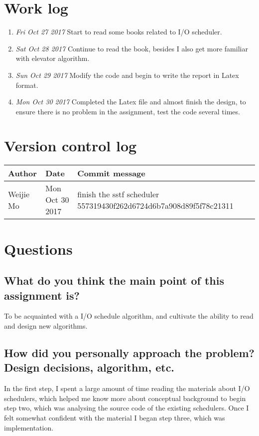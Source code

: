 \documentclass[10pt,draftclsnofoot,peerreview,letterpaper,onecolumn,]{IEEEtran}
\begin{document}
\section{Work log}
\begin{enumerate}
\item \emph{Fri Oct 27 2017} Start to read some books related to I/O scheduler.
\item \emph{Sat Oct 28 2017} Continue to read the book, besides I also get more familiar with elevator algorithm.
\item \emph{Sun Oct 29 2017} Modify the code and begin to write the report in Latex format.
\item \emph{Mon Oct 30 2017} Completed the Latex file and almost finish the design, to ensure there is no problem in the assignment, test the code several times.
\end{enumerate}


\section{Version control log}

\begin{table}[h]
\centering
\begin{tabular}{|l|l|l|l|}
\hline

Author    & Date & Commit message
\\ \hline
Weijie Mo & Mon Oct 30 2017 & finish the sstf scheduler    557319430f262d6724d6b7a908d89f5f78c21311
\\ \hline

\end{tabular}
\end{table}

\section{Questions}
\subsection{What do you think the main point of this assignment is?}
To be acquainted with a I/O schedule algorithm, and cultivate the ability to read and design new algorithms.

\subsection{How did you personally approach the problem? Design decisions, algorithm, etc.}
In the first step, I spent a large amount of time reading the materials about I/O schedulers, which helped me know more about conceptual background to begin step two, which was analysing the source code of the existing schedulers. Once I felt somewhat confident with the material I began step three, which was implementation.
\end{document}
